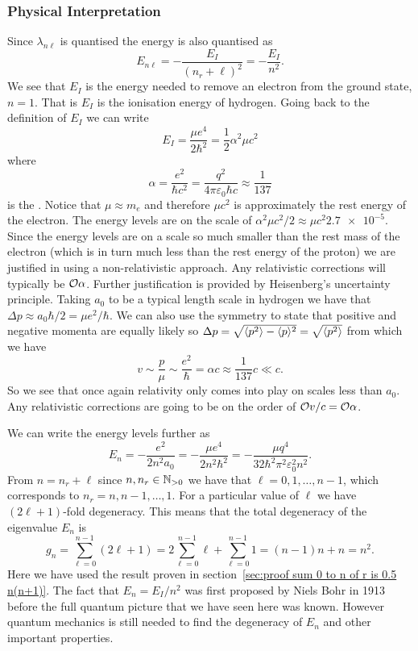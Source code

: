 \subsubsection{Physical Interpretation}
Since \(\lambda_{n\ell}\) is quantised the energy is also quantised as
\[E_{n\ell} = -\frac{E_I}{(n_r + \ell)^2} = -\frac{E_I}{n^2}.\]
We see that \(E_I\) is the energy needed to remove an electron from the ground state, \(n = 1\).
That is \(E_I\) is the ionisation energy of hydrogen.
Going back to the definition of \(E_I\) we can write
\[E_I = \frac{\mu e^4}{2\hbar^2} = \frac{1}{2}\alpha^2\mu c^2\]
where
\[\alpha = \frac{e^2}{\hbar c^2} = \frac{q^2}{4\pi\varepsilon_0\hbar c} \approx \frac{1}{137}\]
is the .
Notice that \(\mu \approx m_e\) and therefore \(\mu c^2\) is approximately the rest energy of the electron.
The energy levels are on the scale of \(\alpha^2\mu c^2/2 \approx \mu c^2 \num{2.7e-5}\).
Since the energy levels are on a scale so much smaller than the rest mass of the electron (which is in turn much less than the rest energy of the proton) we are justified in using a non-relativistic approach.
Any relativistic corrections will typically be \(\mathcal{O}{\alpha}\).
Further justification is provided by Heisenberg's uncertainty principle.
Taking \(a_0\) to be a typical length scale in hydrogen we have that \(\Delta p \approx a_0\hbar/2 = \mu e^2/\hbar\).
We can also use the symmetry to state that positive and negative momenta are equally likely so \(\Delta p = \sqrt{\langle{p^2}\rangle - \langle{p}\rangle^2} = \sqrt{\langle{p^2}\rangle}\) from which we have
\[v \sim \frac{p}{\mu} \sim \frac{e^2}{\hbar} = \alpha c \approx \frac{1}{137}c \ll c.\]
So we see that once again relativity only comes into play on scales less than \(a_0\).
Any relativistic corrections are going to be on the order of \(\mathcal{O}{v/c} = \mathcal{O}{\alpha}\).

We can write the energy levels further as
\[E_n = -\frac{e^2}{2n^2a_0} = -\frac{\mu e^4}{2n^2\hbar^2} = -\frac{\mu q^4}{32\hbar^2\pi^2\varepsilon_0^2n^2}.\]
From \(n = n_r + \ell\) since \(n, n_r\in\mathbb{N}_{>0}\) we have that \(\ell = 0, 1, \dotsc, n - 1\), which corresponds to \(n_r = n, n-1, \dotsc, 1\).
For a particular value of \(\ell\) we have \((2\ell + 1)\)-fold degeneracy.
This means that the total degeneracy of the eigenvalue \(E_n\) is
\[g_n = \sum_{\ell = 0}^{n - 1}(2\ell + 1) = 2\sum_{\ell=0}^{n-1}\ell + \sum_{\ell=0}^{n-1}1 = (n - 1)n + n = n^2.\]
Here we have used the result proven in section~\ref{sec:proof sum 0 to n of r is 0.5 n(n+1)}.
The fact that \(E_n = E_I/n^2\) was first proposed by Niels Bohr in 1913 before the full quantum picture that we have seen here was known.
However quantum mechanics is still needed to find the degeneracy of \(E_n\) and other important properties.


